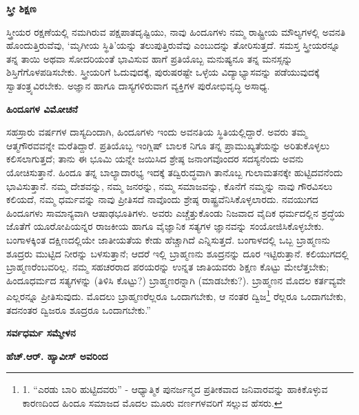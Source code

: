 \begin{center}
\textbf{ಸ್ತ್ರೀ ಶಿಕ್ಷಣ}
\end{center}

ಸ್ತ್ರೀಯರ ರಕ್ಷಣೆಯಲ್ಲಿ ನಮಗಿರುವ ಪಕ್ಷಪಾತದೃಷ್ಟಿಯು, ನಾವು ಹಿಂದೂಗಳು ನಮ್ಮ ರಾಷ್ಟ್ರೀಯ ಮೌಲ್ಯಗಳಲ್ಲಿ ಅವನತಿ ಹೊಂದುತ್ತಿರುವೆವು, ‘ಮೃಗೀಯ ಸ್ಥಿತಿ’ಯನ್ನು ತಲುಪುತ್ತಿರುವೆವು ಎಂಬುದನ್ನು ತೋರಿಸುತ್ತದೆ. ಸಮಸ್ತ ಸ್ತ್ರೀಯರನ್ನೂ ತನ್ನ ತಾಯಿ ಅಥವಾ ಸೋದರಿಯಂತೆ ಭಾವಿಸುವ ಹಾಗೆ ಪ್ರತಿಯೊಬ್ಬ ಮನುಷ್ಯನೂ ತನ್ನ ಮನಸ್ಸನ್ನು ಶಿಸ್ತಿಗೆಗೊಳಪಡಿಸಬೇಕು. ಸ್ತ್ರೀಯರಿಗೆ ಓದುವುದಕ್ಕೆ, ಪುರುಷರಷ್ಟೇ ಒಳ್ಳೆಯ ವಿದ್ಯಾಭ್ಯಾಸವನ್ನು ಪಡೆಯುವುದಕ್ಕೆ ಸ್ವಾತಂತ್ರ್ಯವಿರಬೇಕು. ಅಜ್ಞಾನ ಹಾಗೂ ದಾಸ್ಯಗಳಿರುವಾಗ ವ್ಯಕ್ತಿಗಳ ಪುರೋಭಿವೃದ್ಧಿ ಅಸಾಧ್ಯ.

\begin{center}
\textbf{ಹಿಂದೂಗಳ ವಿಮೋಚನೆ}
\end{center}

ಸಹಸ್ರಾರು ವರ್ಷಗಳ ದಾಸ್ಯದಿಂದಾಗಿ, ಹಿಂದೂಗಳು ಇಂದು ಅವನತಿಯ ಸ್ಥಿತಿಯಲ್ಲಿದ್ದಾರೆ. ಅವರು ತಮ್ಮ ಆತ್ಮಗೌರವವನ್ನೇ ಮರೆತಿದ್ದಾರೆ. ಪ್ರತಿಯೊಬ್ಬ ಇಂಗ್ಲಿಷ್ ಬಾಲಕ ನಿಗೂ ತನ್ನ ಪ್ರಾಮುಖ್ಯತೆಯನ್ನು ಅರಿತುಕೊಳ್ಳಲು ಕಲಿಸಲಾಗುತ್ತದೆ; ತಾನು ಈ ಭೂಮಿ ಯನ್ನೇ ಜಯಿಸಿದ ಶ್ರೇಷ್ಠ ಜನಾಂಗವೊಂದರ ಸದಸ್ಯನೆಂದು ಅವನು ಯೋಚಿಸುತ್ತಾನೆ. ಹಿಂದೂ ತನ್ನ ಬಾಲ್ಯಾದಾರಭ್ಯ ಇದಕ್ಕೆ ತದ್ವಿರುದ್ಧವಾಗಿ ತಾನೊಬ್ಬ ಗುಲಾಮತನಕ್ಕೇ ಹುಟ್ಟಿದವನೆಂದು ಭಾವಿಸುತ್ತಾನೆ. ನಮ್ಮ ದೇಶವನ್ನು, ನಮ್ಮ ಜನರನ್ನು, ನಮ್ಮ ಸಮಾಜವನ್ನು, ಕೊನೆಗೆ ನಮ್ಮನ್ನು ನಾವು ಗೌರವಿಸಲು ಕಲಿಯದೆ, ನಮ್ಮ ಧರ್ಮವನ್ನು ನಾವು ಪ್ರೀತಿಸದೆ ನಾವೊಂದು ಶ್ರೇಷ್ಠ ರಾಷ್ಟ್ರವೆನಿಸಿಕೊಳ್ಳಲಾರದು. ನವಯುಗದ ಹಿಂದೂಗಳು ಸಾಮಾನ್ಯವಾಗಿ ಆಷಾಢಭೂತಿಗಳು. ಅವರು ಎಚ್ಚೆತ್ತುಕೊಂಡು ನಿಜವಾದ ವೈದಿಕ ಧರ್ಮದಲ್ಲಿನ ಶ್ರದ್ಧೆಯ ಜೊತೆಗೆ ಯೂರೋಪಿಯನ್ನರ ರಾಜಕೀಯ ಹಾಗೂ ವೈಜ್ಞಾನಿಕ ಸತ್ಯಗಳ ಜ್ಞಾನವನ್ನು ಸಂಯೋಜಿಸಿಕೊಳ್ಳಬೇಕು. ಬಂಗಾಳಕ್ಕಿಂತ ದಕ್ಷಿಣದಲ್ಲಿಯೇ ಜಾತೀಯತೆಯ ಕೇಡು ಹೆಚ್ಚಾಗಿದೆ ಎನ್ನಿಸುತ್ತದೆ. ಬಂಗಾಳದಲ್ಲಿ ಒಬ್ಬ ಬ್ರಾಹ್ಮಣನು ಶೂದ್ರರು ಮುಟ್ಟಿದ ನೀರನ್ನು ಬಳಸುತ್ತಾನೆ; ಆದರೆ ಇಲ್ಲಿ ಬ್ರಾಹ್ಮಣನು ಶೂದ್ರನನ್ನು ದೂರ ಇಟ್ಟಿರುತ್ತಾನೆ. ಕಲಿಯುಗದಲ್ಲಿ ಬ್ರಾಹ್ಮಣರೆಂಬವರಿಲ್ಲ. ನಮ್ಮ ಸಹಚರರಾದ ಪರಯರನ್ನು ಉನ್ನತ ಜಾತಿಯವರು ಶಿಕ್ಷಣ ಕೊಟ್ಟು ಮೇಲೆತ್ತಬೇಕು; ಹಿಂದೂಧರ್ಮದ ಸತ್ಯಗಳನ್ನು (ತಿಳಿಸಿ ಕೊಟ್ಟು?) ಬ್ರಾಹ್ಮಣರನ್ನಾಗಿ (ಮಾಡಬೇಕು?). ಬ್ರಾಹ್ಮಣನ ಮೊದಲ ಕರ್ತವ್ಯವೇ ಎಲ್ಲರನ್ನೂ ಪ್ರೀತಿಸುವುದು. ಮೊದಲು ಬ್ರಾಹ್ಮಣರೆಲ್ಲರೂ ಒಂದಾಗಬೇಕು, ಆ ನಂತರ ದ್ವಿಜ\footnote{1. “ಎರಡು ಬಾರಿ ಹುಟ್ಟಿದವರು” - ಆಧ್ಯಾತ್ಮಿಕ ಪುನರ್ಜನ್ಮದ ಪ್ರತೀಕವಾದ ಜನಿವಾರವನ್ನು ಹಾಕಿಕೊಳ್ಳುವ ಕಾರಣದಿಂದ ಹಿಂದೂ ಸಮಾಜದ ಮೊದಲ ಮೂರು ವರ್ಣಗಳವರಿಗೆ ಸಲ್ಲುವ ಹೆಸರು.} ರೆಲ್ಲರೂ ಒಂದಾಗಬೇಕು, ತದನಂತರ ದ್ವಿಜರೂ ಶೂದ್ರರೂ ಒಂದಾಗಬೇಕು.”

\begin{center}
\textbf{ಸರ್ವಧರ್ಮ ಸಮ್ಮೇಳನ}
\end{center}

\begin{center}
\textbf{ಹೆಚ್.ಆರ್. ಹ್ಯಾವೀಸ್ ಅವರಿಂದ}
\end{center}

